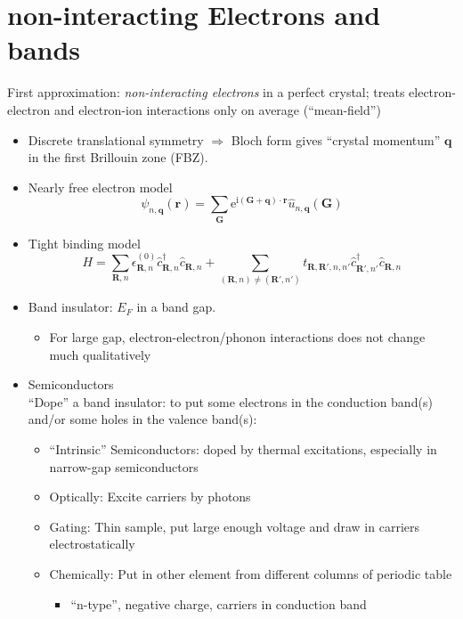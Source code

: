 \documentclass[11pt,letterpaper]{article}
\numberwithin{equation}{section} %
\renewcommand*{\vec}[1]{\bm{#1}}
\newcommand\mi{\mathrm{i}}
\newcommand\e{\mathrm{e}}
\begin{document}
\section{non-interacting Electrons and bands}
\label{sec:non_interacting_electrons}
First approximation: \emph{non-interacting electrons} in a perfect crystal;
treats electron-electron and electron-ion interactions only on average
(``mean-field'')
\begin{itemize}
  \item Discrete translational symmetry $\Rightarrow$ Bloch form gives 
	  ``crystal momentum'' $\vec q$ in the first Brillouin zone (FBZ). 
  \item Nearly free electron model
	  \begin{equation}
		  \psi_{n, \vec q}(\vec r) = \sum_{\vec G} \e^{\mi(\vec G+\vec
		  q)\cdot\vec r} \hat u_{n,\vec q}(\vec G)
	  \end{equation}
  \item Tight binding model
	  \begin{equation}
		  H = \sum_{\vec R, n}\epsilon^{(0)}_{\vec R, n} 
		  \hat c_{\vec R, n}^\dagger \hat c_{\vec R, n}
		  + \sum_{(\vec R, n)\neq (\vec R', n')} t_{\vec R, \vec R', n, n'}
		  \hat c_{\vec R', n'}^\dagger \hat c_{\vec R, n}
	  \end{equation}
  \item Band insulator: $E_F$ in a band gap. 
	  \begin{itemize}
	    \item For large gap, electron-electron/phonon interactions does not
			change much qualitatively
	  \end{itemize}
  \item Semiconductors\\
	  ``Dope'' a band insulator: to put some electrons in
	  the conduction band(s) and/or some holes in the valence band(s): 
	  \begin{itemize}
	    \item ``Intrinsic'' Semiconductors: doped by thermal excitations,
			especially in narrow-gap semiconductors
		\item Optically: Excite carriers by photons
		\item Gating: Thin sample, put large enough voltage and draw in
			carriers electrostatically
		\item Chemically: Put in other element from different columns of
			periodic table
			\begin{itemize}
			  \item ``n-type'', negative charge, carriers in conduction band

\end{itemize}
\end{itemize}
\end{itemize}
\end{document}
